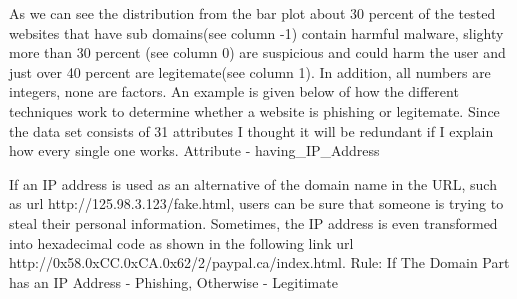 \documentclass{article}\usepackage[]{graphicx}\usepackage[]{color}
\begin{document}
As we can see the distribution from the bar plot about 30 percent of the tested websites that have sub domains(see column -1) contain harmful malware, slighty more than 30 percent (see column 0) are suspicious and could harm the user and just over 40 percent are legitemate(see column 1). In addition, all numbers are integers, none are factors. 
\newline
\newline An example is given below of how the different techniques work to determine whether a website is phishing or legitemate. Since the data set consists of 31 attributes I thought it will be redundant if I explain how every single one works.
\newline 
\newline
Attribute - having\_IP\_Address
\newline

If an IP address is used as an alternative of the domain name in the URL, such as url{  http://125.98.3.123/fake.html}, users can be sure that someone is trying to steal their personal information. Sometimes, the IP address is even transformed into hexadecimal code as shown in the following link url{ http://0x58.0xCC.0xCA.0x62/2/paypal.ca/index.html}.
\newline
Rule: If The Domain Part has an IP Address - Phishing, Otherwise - Legitimate
\newline
\end{document}
